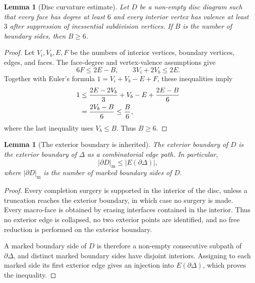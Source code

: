 \documentclass{article}
\newtheorem{lm}[theorem]{Lemma}
\begin{document}



\begin{lm}[Disc curvature estimate]\label{lm:disc-curvature-new}
Let $D$ be a non-empty disc diagram such that every face has degree at least
$6$ and every interior vertex has valence at least $3$ after suppression of
inessential subdivision vertices.  If $B$ is the number of boundary sides,
then $B\geq6$.
\end{lm}

\begin{proof}
Let $V_i,V_b,E,F$ be the numbers of interior vertices, boundary vertices,
edges, and faces.  The face-degree and vertex-valence assumptions give
\[
        6F\leq2E-B,
        \qquad
        3V_i+2V_b\leq2E.
\]
Together with Euler's formula $1=V_i+V_b-E+F$, these inequalities imply
\[
\begin{aligned}
1
&\leq {2E-2V_b\over3}+V_b-E+{2E-B\over6}\\
&={2V_b-B\over6}
\leq {B\over6},
\end{aligned}
\]
where the last inequality uses $V_b\leq B$.  Thus $B\geq6$.
\end{proof}

\begin{lm}[The exterior boundary is inherited]\label{lm:boundary-inherited-new}
The exterior boundary of $D$ is the exterior boundary of $\Delta$ as a
combinatorial edge path.  In particular,
\[
        |\partial D|_{\mathrm m}\leq |E(\partial\Delta)|,
\]
where $|\partial D|_{\mathrm m}$ is the number of marked boundary sides of
$D$.
\end{lm}

\begin{proof}
Every completion surgery is supported in the interior of the disc, unless a
truncation reaches the exterior boundary, in which case no surgery is made.
Every macro-face is obtained by erasing interfaces contained in the interior.
Thus no exterior edge is collapsed, no two exterior points are identified,
and no free reduction is performed on the exterior boundary.

A marked boundary side of $D$ is therefore a non-empty consecutive subpath of
$\partial\Delta$, and distinct marked boundary sides have disjoint interiors.
Assigning to each marked side its first exterior edge gives an injection into
$E(\partial\Delta)$, which proves the inequality.
\end{proof}
\end{document}
